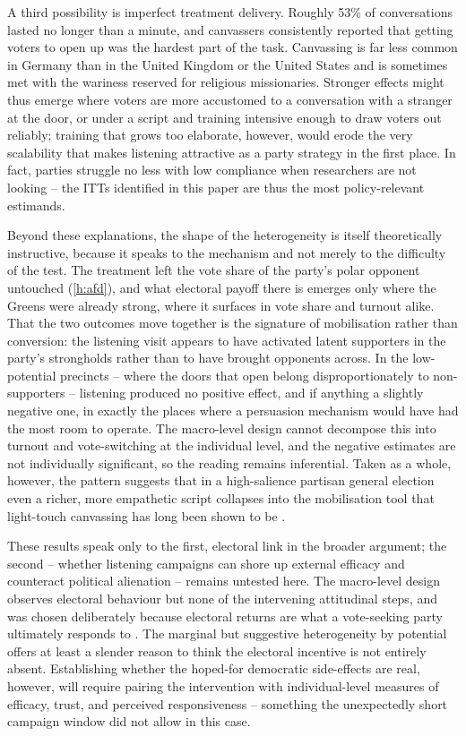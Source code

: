 \documentclass[11pt,a4paper]{scrartcl}
\begin{document}
A third possibility is imperfect treatment delivery. Roughly 53\% of conversations lasted no longer than a minute, and canvassers consistently reported that getting voters to open up was the hardest part of the task. Canvassing is far less common in Germany than in the United Kingdom or the United States and is sometimes met with the wariness reserved for religious missionaries. Stronger effects might thus emerge where voters are more accustomed to a conversation with a stranger at the door, or under a script and training intensive enough to draw voters out reliably; training that grows too elaborate, however, would erode the very scalability that makes listening attractive as a party strategy in the first place. In fact, parties struggle no less with low compliance when researchers are not looking -- the ITTs identified in this paper are thus the most policy-relevant estimands.

Beyond these explanations, the shape of the heterogeneity is itself theoretically instructive, because it speaks to the mechanism and not merely to the difficulty of the test. The treatment left the vote share of the party's polar opponent untouched (\autoref{h:afd}), and what electoral payoff there is emerges only where the Greens were already strong, where it surfaces in vote share and turnout alike. That the two outcomes move together is the signature of mobilisation rather than conversion: the listening visit appears to have activated latent supporters in the party's strongholds rather than to have brought opponents across. In the low-potential precincts -- where the doors that open belong disproportionately to non-supporters -- listening produced no positive effect, and if anything a slightly negative one, in exactly the places where a persuasion mechanism would have had the most room to operate. The macro-level design cannot decompose this into turnout and vote-switching at the individual level, and the negative estimates are not individually significant, so the reading remains inferential. Taken as a whole, however, the pattern suggests that in a high-salience partisan general election even a richer, more empathetic script collapses into the mobilisation tool that light-touch canvassing has long been shown to be \autocite{kallaMinimalPersuasiveEffects2018}.

These results speak only to the first, electoral link in the broader argument; the second -- whether listening campaigns can shore up external efficacy and counteract political alienation -- remains untested here. The macro-level design observes electoral behaviour but none of the intervening attitudinal steps, and was chosen deliberately because electoral returns are what a vote-seeking party ultimately responds to \autocite{foosPartiesAreNo2018}. The marginal but suggestive heterogeneity by potential offers at least a slender reason to think the electoral incentive is not entirely absent. Establishing whether the hoped-for democratic side-effects are real, however, will require pairing the intervention with individual-level measures of efficacy, trust, and perceived responsiveness -- something the unexpectedly short campaign window did not allow in this case.
\end{document}
